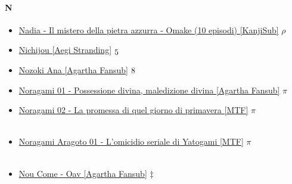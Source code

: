		\paragraph{N} \hypertarget{ON}{}
			\begin{itemize}
				\item \href{https://mega.nz/#F!Ud5j3DzQ!XKzDr-7KIwzsX7rlYHFCsg} {Nadia - Il mistero della pietra azzurra - Omake (10 episodi) [KanjiSub]} $\rho$ \\ 
				\item \href{https://mega.nz/#!mmgSAa4Y!smybwHu30K8jCI9hlJyV6UllkKcEtFOGhLDEVs_-hTE} {Nichijou [Aegi Stranding]} $\oldstylenums{5}$ \\ 
				\item \href{https://mega.nz/#!r3QVFAgI!G05dmfAns04voOW8sT64IVw69dfPJ2H-PslRbtKEhj8} {Nozoki Ana [Agartha Fansub]} $\oldstylenums{8}$ \\  
				\item \href{https://mega.nz/#!QUYF1KrT!EnFg17gso1z6wThJxdPDstBJgB6TeBco_RuyA94BPIg} {Noragami 01 - Possessione divina, maledizione divina [Agartha Fansub]} $\pi$ \\  
				\item \href{https://mega.nz/#!FJBSyQ7Q!lpvcsG_jLycTKekBXYcYVY53vjoZ4kl_UE0oLp2QENs} {Noragami 02 - La promessa di quel giorno di primavera [MTF]} $\pi$ \\ \\  
				\item \href{https://mega.nz/#!9QAXFZhB!KNMj1Jwm4jTWbbhkqdVEjVGMzZHnqDoFweHHm0qeA8o} {Noragami Aragoto 01 - L'omicidio seriale di Yatogami [MTF]} $\pi$ \\ \\  
				\item \href{https://mega.nz/#!7yYlTYZB!6_4EwlweaC2lKxVxVOo47Z0pgUN8wIrncNfA2VSpQ5g} {Nou Come - Oav [Agartha Fansub]} $\ddag$ \\ \\  
			
			\end{itemize}
		
